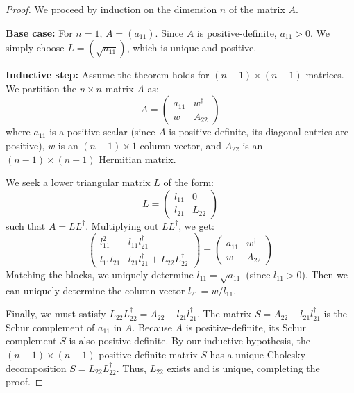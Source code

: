   \begin{proof}
    We proceed by induction on the dimension $n$ of the matrix $A$. 
    
    \textbf{Base case:} For $n=1$, $A = (a_{11})$. Since $A$ is positive-definite, $a_{11} > 0$. We simply choose $L = (\sqrt{a_{11}})$, which is unique and positive. 
    
    \textbf{Inductive step:} Assume the theorem holds for $(n-1) \times (n-1)$ matrices. We partition the $n \times n$ matrix $A$ as:
    \begin{equation}
      A = \begin{pmatrix} a_{11} & w^\dagger \\ w & A_{22} \end{pmatrix}
    \end{equation}
    where $a_{11}$ is a positive scalar (since $A$ is positive-definite, its diagonal entries are positive), $w$ is an $(n-1) \times 1$ column vector, and $A_{22}$ is an $(n-1) \times (n-1)$ Hermitian matrix. 
    
    We seek a lower triangular matrix $L$ of the form:
    \begin{equation}
      L = \begin{pmatrix} l_{11} & 0 \\ l_{21} & L_{22} \end{pmatrix}
    \end{equation}
    such that $A = L L^\dagger$. Multiplying out $L L^\dagger$, we get:
    \begin{equation}
      \begin{pmatrix} l_{11}^2 & l_{11} l_{21}^\dagger \\ l_{11} l_{21} & l_{21} l_{21}^\dagger + L_{22} L_{22}^\dagger \end{pmatrix} = \begin{pmatrix} a_{11} & w^\dagger \\ w & A_{22} \end{pmatrix}
    \end{equation}
    Matching the blocks, we uniquely determine $l_{11} = \sqrt{a_{11}}$ (since $l_{11} > 0$). Then we can uniquely determine the column vector $l_{21} = w / l_{11}$. 
    
    Finally, we must satisfy $L_{22} L_{22}^\dagger = A_{22} - l_{21} l_{21}^\dagger$. The matrix $S = A_{22} - l_{21} l_{21}^\dagger$ is the Schur complement of $a_{11}$ in $A$. Because $A$ is positive-definite, its Schur complement $S$ is also positive-definite. By our inductive hypothesis, the $(n-1) \times (n-1)$ positive-definite matrix $S$ has a unique Cholesky decomposition $S = L_{22} L_{22}^\dagger$. Thus, $L_{22}$ exists and is unique, completing the proof.
  \end{proof}

